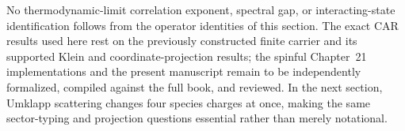 No thermodynamic-limit correlation exponent, spectral gap, or
interacting-state identification follows from the operator identities
of this section.  The exact CAR results used here rest on the
previously constructed finite carrier and its supported Klein and
coordinate-projection results; the spinful Chapter~21 implementations
and the present manuscript remain to be independently formalized,
compiled against the full book, and reviewed.  In the next section,
Umklapp scattering changes four species charges at once, making the
same sector-typing and projection questions essential rather than
merely notational.

